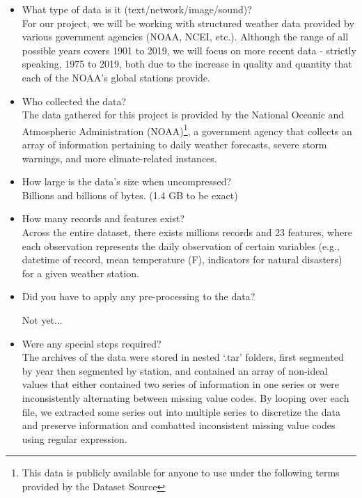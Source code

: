 \documentclass[conference]{IEEEtran}
\begin{document}
\begin{itemize}

  \item What type of data is it (text/network/image/sound)? \\

  For our project, we will be working with structured weather data provided by various government agencies (NOAA, NCEI, etc.). Although the range of all possible years covers 1901 to 2019, we will focus on more recent data - strictly speaking, 1975 to 2019, both due to the increase in quality and quantity that each of the NOAA's global stations provide. \\

  \item Who collected the data? \\

  The data gathered for this project is provided by the National Oceanic and Atmospheric Administration (NOAA)\footnote{This data is publicly available for anyone to use under the following terms provided by the Dataset Source}, a government agency that collects an array of information pertaining to daily weather forecasts, severe storm warnings, and more climate-related instances. \\

  \item How large is the data's size when uncompressed? \\

  Billions and billions of bytes. (1.4 GB to be exact) \\

  \item How many records and features exist? \\

  Across the entire dataset, there exists millions records and 23 features, where each observation represents the daily observation of certain variables (e.g., datetime of record, mean temperature (F), indicators for natural disasters) for a given weather station. \\

  \item Did you have to apply any pre-processing to the data?

  Not yet... \\

  \item Were any special steps required? \\

    The archives of the data were stored in nested `.tar' folders, first segmented by year then segmented by station, and contained an array of non-ideal values that either contained two series of information in one series or were inconsistently alternating between missing value codes. By looping over each file, we extracted some series out into multiple series to discretize the data and preserve information and combatted inconsistent missing value codes using regular expression. \\


\end{itemize}
\end{document}
